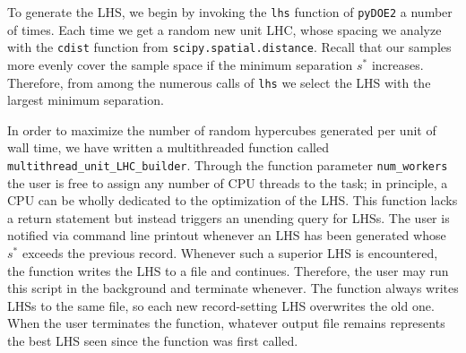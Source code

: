 To generate the LHS, we begin by invoking the \texttt{lhs} function of
\texttt{pyDOE2} a number of times. Each time we get a random new unit LHC, 
whose spacing we analyze with the \texttt{cdist} function from
\texttt{scipy.spatial.distance}. Recall that
our samples more evenly cover the sample space if the minimum separation
$s^*$ increases. Therefore, from among the numerous calls of \texttt{lhs} we 
select the LHS with the largest minimum separation.

In order to maximize the number of random hypercubes generated per unit of
wall time, we have written a multithreaded function called
\verb|multithread_unit_LHC_builder|.
Through the function parameter \verb|num_workers| the user is free to assign
any number of CPU threads to the task; in principle, a CPU can be
wholly dedicated to the optimization of the LHS.
This function lacks a return statement but
instead triggers an unending query for LHSs. The user is notified via command
line printout whenever an LHS has been generated whose $s^*$ exceeds
the previous record. Whenever such a superior LHS is
encountered, the function writes the LHS to a file and continues. Therefore,
the user may run this script in the background and terminate whenever. The
function always writes LHSs to the same file, so each new record-setting LHS
overwrites the old one. When the user terminates the function, whatever output
file remains represents the best LHS seen since the function was first called.

\begin{comment}
The \verb|cdist| function can be re-used to compare LHSs loaded from 
different
files. However, since there is generally little reason to keep old LHSs
(except, perhaps, to reconstruct specific emulators), it reduces clutter to
simply continue overwriting the same file. Therefore, the function
\verb|multithread_unit_LHC_builder| also includes a parameter
\verb|previous_record|, which is recommended whenever the user would like to
stop the function and then resume it later. In such a case, the parameter
should be set to the \verb|cdist| value of the exis}
\end{comment}


